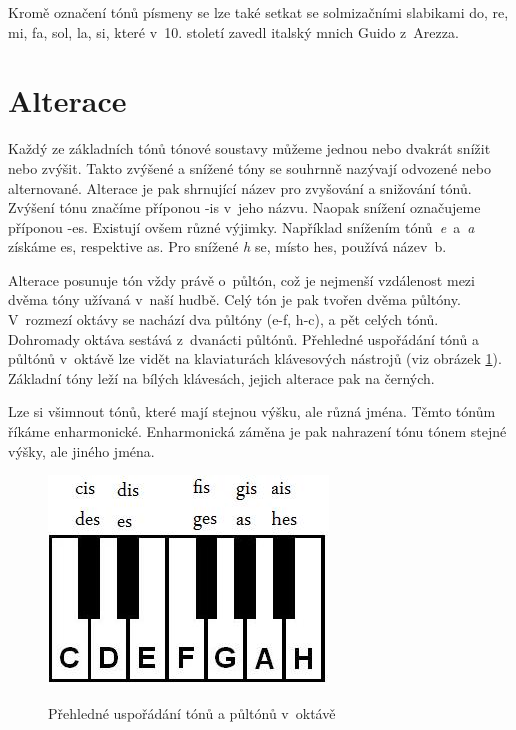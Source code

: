 Kromě označení tónů písmeny se lze také setkat se solmizačními slabikami do, re, mi, fa, sol, la, si,
které v~10. století zavedl italský mnich Guido z~Arezza.
\cite{cmiral}
\par    

\section{Alterace}
Každý ze základních tónů tónové soustavy můžeme jednou nebo dvakrát snížit nebo zvýšit.
Takto zvýšené a snížené tóny se souhrnně nazývají odvozené nebo alternované.
Alterace je pak shrnující název pro zvyšování a snižování tónů.
Zvýšení tónu značíme příponou -is v~jeho názvu.
Naopak snížení označujeme příponou -es.
Existují ovšem různé výjimky.
Například snížením tónů\emph{~e}~a\emph{~a} získáme es, respektive as.
Pro snížené \emph{h} se, místo hes, používá název~b.
\cite{zenkl}
\par

Alterace posunuje tón vždy právě o~půltón, 
což je nejmenší vzdálenost mezi dvěma tóny užívaná v~naší hudbě.
Celý tón je pak tvořen dvěma půltóny. 
V~rozmezí oktávy se nachází dva půltóny ({e-f, h-c}), a pět celých tónů.
Dohromady oktáva sestává z~dvanácti půltónů.
Přehledné uspořádání tónů a půltónů v~oktávě lze vidět na klaviaturách klávesových nástrojů (viz obrázek \ref{obrazekRozlozeniKlaviatury}).
Základní tóny leží na bílých klávesách, jejich alterace pak na černých.
\cite{zenkl,cmiral}
\par

Lze si všimnout tónů, které mají stejnou výšku, ale různá jména.
Těmto tónům říkáme enharmonické. Enharmonická záměna je pak nahrazení tónu tónem stejné výšky, ale jiného jména.\cite{zenkl}

\begin{figure}[h]\centering
    \centering
    \includegraphics[width=0.4\linewidth]{obrazky/klaviatura.jpg}\\[1pt]  
    \caption{Přehledné uspořádání tónů a půltónů v~oktávě }    
    \label{obrazekRozlozeniKlaviatury}
\end{figure}

